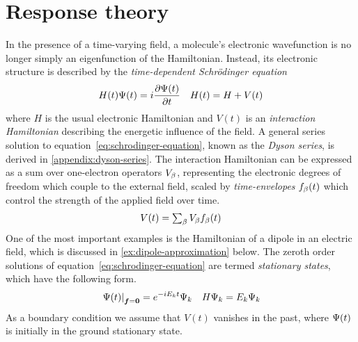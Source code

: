 \documentclass[11pt]{article}
\numberwithin{equation}{section}
\begin{document}
\setlength{\abovedisplayskip}{5pt}
\setlength{\belowdisplayskip}{5pt}


\setcounter{section}{8}
\section{Response theory}

\begin{rmk}
In the presence of a time-varying field, a molecule's electronic wavefunction is no longer simply an eigenfunction of the Hamiltonian.
Instead, its electronic structure is described by the \textit{time-dependent Schr\"odinger equation}
\begin{align}
\label{eq:schrodinger-equation}
  H(t)
  \Psi (t)
=
  i
  \frac {\partial\Psi (t)}{\partial t}
&&
  H(t)
=
  H
+
  V(t)
\end{align}
where $H$ is the usual electronic Hamiltonian and $V(t)$ is an \textit{interaction Hamiltonian} describing the energetic influence of the field.
A general series solution to equation~\ref{eq:schrodinger-equation}, known as the \textit{Dyson series}, is derived in \cref{appendix:dyson-series}.
The interaction Hamiltonian can be expressed as a sum over one-electron operators $V_{\beta }$, representing the electronic degrees of freedom which couple to the external field, scaled by \textit{time-envelopes} $f_{\beta }(t)$ which control the strength of the applied field over time.
\begin{align}
\label{eq:interaction-time-envelopes}
  V(t)
=
{\textstyle
  \sum_{\beta }
  V_{\beta }
  f_{\beta }(t)
}
\end{align}
One of the most important examples is the Hamiltonian of a dipole in an electric field, which is discussed in \cref{ex:dipole-approximation} below.
The zeroth order solutions of equation~\ref{eq:schrodinger-equation} are termed \textit{stationary states}, which have the following form.\footnotemark
{}
\begin{align}
  \left.
  \Y(t)
  \right|_{\bm{f}=\bo{0}}
=
  e^{-iE_kt}
  \Y_k
&&
  H\Y_k
=
  E_k\Y_k
\end{align}
As a boundary condition we assume that $V(t)$ vanishes in the past, where $\Psi (t)$ is initially in the ground stationary state.

\end{rmk}
\end{document}
